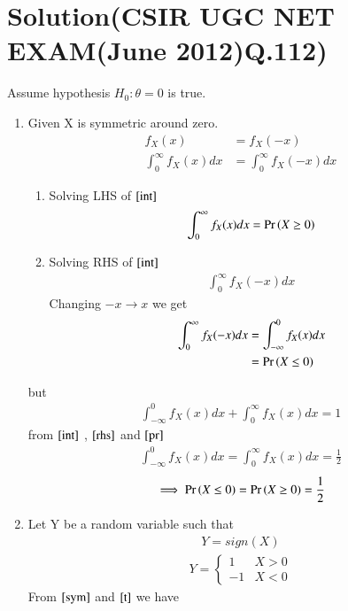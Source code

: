 \documentclass[journal,12pt,twocolumn]{IEEEtran}
\begin{document}
\section{Solution(CSIR UGC NET EXAM(June 2012)Q.112)}
Assume hypothesis
$H_0:\theta=0$ is true.
\begin{enumerate}
\item Given X is symmetric around zero.
 \begin{align}
  f_X(x)&=f_X(-x)\\
  \int_{0}^{\infty}f_X(x)dx&=\int_{0}^{\infty}f_X(-x)dx
  \label{int}
\end{align}
\begin{enumerate}
\item Solving LHS of $\eqref{int}$
\begin{align}
    \int_{0}^{\infty}f_X(x)dx=\Pr\left(X\geq0\right)
\end{align}
\item Solving RHS of $\eqref{int}$
\begin{align}
    \int_{0}^{\infty}f_X(-x)dx
\end{align}
Changing $-x \rightarrow x$ we get 
\begin{align}
  \int_{0}^{\infty}f_X(-x)dx&=\int_{-\infty}^{0}f_X(x)dx\label{rhs}\\
  &=\Pr\left(X\leq0\right)
\end{align}
\end{enumerate}
but
\begin{align}
  \int_{-\infty}^{0}f_X(x)dx+\int_{0}^{\infty}f_X(x)dx=1
  \label{pr}
\end{align}
from $\eqref{int}$ , $\eqref{rhs}$ and $\eqref{pr}$
\begin{align}
\int_{-\infty}^{0}f_X(x)dx=\int_{0}^{\infty}f_X(x)dx=\frac{1}{2}
\end{align}
\begin{align}
    \implies \Pr\left(X\leq 0\right)=\Pr\left(X\geq0\right)=\frac{1}{2}
    \label{sym}
\end{align}
\item Let Y be a random variable such that
\begin{align}
    Y=sign(X)
\end{align}
\begin{align}
    Y=
    \begin{cases}
     1 & X>0\\
    -1 & X<0
    \end{cases}
    \label{t}
\end{align}
From $\eqref{sym}$ and $\eqref{t}$
we have
\begin{align}

\end{align}
\end{enumerate}
\end{document}
